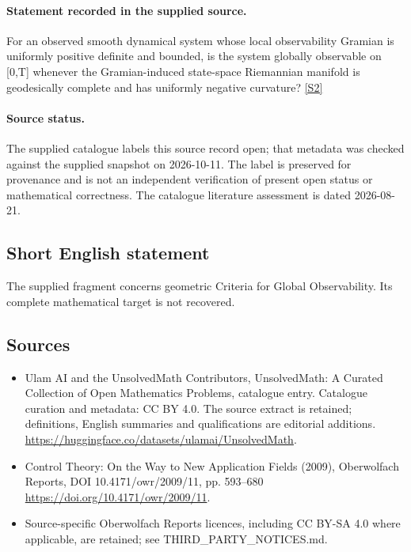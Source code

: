 \documentclass[11pt]{article}
\newcommand{\sref}[2]{\hyperlink{source:#1:#2}{[S#2]}}
\begin{document}
\paragraph{Statement recorded in the supplied source.}
For an observed smooth dynamical system whose local observability Gramian is uniformly positive definite and bounded, is the system globally observable on [0,T] whenever the Gramian-induced state-space Riemannian manifold is geodesically complete and has uniformly negative curvature? \sref{statement}{2}
\paragraph{Source status.}
The supplied catalogue labels this source record open; that metadata was checked against the supplied snapshot on 2026-10-11. The label is preserved for provenance and is not an independent verification of present open status or mathematical correctness. The catalogue literature assessment is dated 2026-08-21.
\subsection{Short English statement}
The supplied fragment concerns geometric Criteria for Global Observability. Its complete mathematical target is not recovered.
\subsection{Sources}
\begin{itemize}
\item[\hypertarget{source:statement:1}{S1}] Ulam AI and the UnsolvedMath Contributors, UnsolvedMath: A Curated Collection of Open Mathematics Problems, catalogue entry. Catalogue curation and metadata: CC BY 4.0. The source extract is retained; definitions, English summaries and qualifications are editorial additions.
\url{https://huggingface.co/datasets/ulamai/UnsolvedMath}.
\item[\hypertarget{source:statement:2}{S2}] Control Theory: On the Way to New Application Fields (2009), Oberwolfach Reports, DOI 10.4171/owr/2009/11, pp. 593--680
\url{https://doi.org/10.4171/owr/2009/11}.
\item Source-specific Oberwolfach Reports licences, including CC BY-SA 4.0 where applicable, are retained; see THIRD\_PARTY\_NOTICES.md.
\end{itemize}
\end{document}
